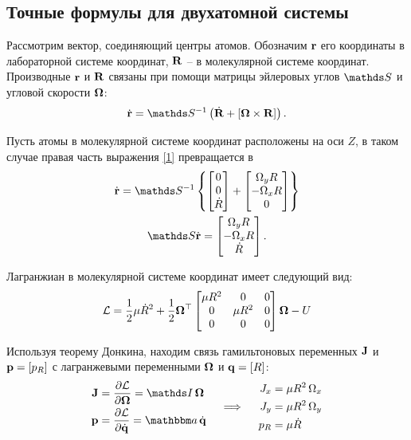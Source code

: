 \subsection{Точные формулы для двухатомной системы}

Рассмотрим вектор, соединяющий центры атомов. Обозначим $\mathbf{r}$ его координаты в лабораторной системе координат, $\mathbf{R}$ -- в молекулярной системе координат. Производные $\mathbf{r}$ и $\mathbf{R}$ связаны при помощи матрицы эйлеровых углов $\bbS$ и угловой скорости $\mathbf{\Omega}$:
\begin{gather}
		\dot{\mf{r}} = \bbS^{-1} \lb \dot{\mf{R}} + \left[ \mf{\Omega} \times \mf{R} \right] \rb. \label{1} 
\end{gather}

Пусть атомы в молекулярной системе координат расположены на оси $Z$, в таком случае правая часть выражения \eqref{1} превращается в 
\begin{gather}
\dot{\mf{r}} = \bbS^{-1} \left\{
\begin{bmatrix}
		0 \\
		0 \\
		\dot{R}
\end{bmatrix}
+
\begin{bmatrix}
		\Omega_y R \\
		- \Omega_x R \\
		0
\end{bmatrix}
\right\} \notag \\
\bbS \dot{\mf{r}} =
\begin{bmatrix}
\Omega_y R \\
- \Omega_x R \\
\dot{R}
\end{bmatrix}. \label{2}
\end{gather}

Лагранжиан в молекулярной системе координат имеет следующий вид:
\begin{gather}
\mathcal{L} = \frac{1}{2} \mu \dot{R}^2 + \frac{1}{2} \mathbf{\Omega}^\top
\begin{bmatrix}
		\mu R^2 & 0 & 0 \\
		0 & \mu R^2 & 0 \\
		0 & 0 & 0
\end{bmatrix}
\mathbf{\Omega} - U \notag
\end{gather}

Используя теорему Донкина, находим связь гамильтоновых переменных $\mathbf{J}$ и $\mathbf{p} = \left[ p_R \right]$ с лагранжевыми переменными $\mathbf{\Omega}$ и $\mathbf{q} = \left[ R \right]$:
\begin{gather}
\begin{aligned}
\mf{J} &= \frac{\partial \mL}{\partial \mf{\Omega}} = \bbI \, \mf{\Omega} \\
\mf{p} &= \frac{\partial \mL}{\partial \dot{\mf{q}}} = \bba \, \dot{\mf{q}}
\end{aligned}
\quad \implies \quad
\begin{aligned}
		J_x &= \mu R^2 \, \Omega_x \\
		J_y &= \mu R^2 \, \Omega_y \\
		p_R &= \mu \dot{R}
\end{aligned} \label{3}
\end{gather}

